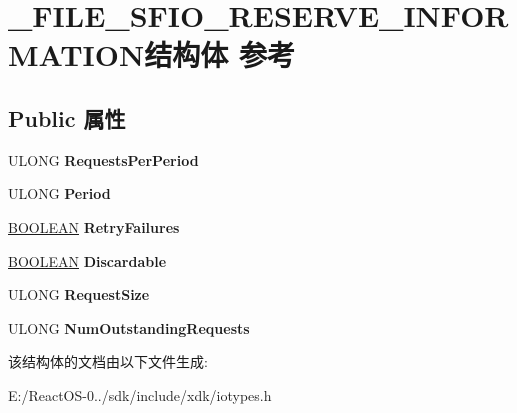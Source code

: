 \hypertarget{struct___f_i_l_e___s_f_i_o___r_e_s_e_r_v_e___i_n_f_o_r_m_a_t_i_o_n}{}\section{\+\_\+\+F\+I\+L\+E\+\_\+\+S\+F\+I\+O\+\_\+\+R\+E\+S\+E\+R\+V\+E\+\_\+\+I\+N\+F\+O\+R\+M\+A\+T\+I\+O\+N结构体 参考}
\label{struct___f_i_l_e___s_f_i_o___r_e_s_e_r_v_e___i_n_f_o_r_m_a_t_i_o_n}
\subsection*{Public 属性}
\begin{DoxyCompactItemize}
\item 
\mbox{\label{struct___f_i_l_e___s_f_i_o___r_e_s_e_r_v_e___i_n_f_o_r_m_a_t_i_o_n_ab698cd09c96685b260926b89ec61195f}} 
U\+L\+O\+NG {\bfseries Requests\+Per\+Period}
\item 
\mbox{\label{struct___f_i_l_e___s_f_i_o___r_e_s_e_r_v_e___i_n_f_o_r_m_a_t_i_o_n_a633493f5b7dbd9a9ecf31043e99de366}} 
U\+L\+O\+NG {\bfseries Period}
\item 
\mbox{\label{struct___f_i_l_e___s_f_i_o___r_e_s_e_r_v_e___i_n_f_o_r_m_a_t_i_o_n_a7668650e4a180e6384a37945d238d036}} 
\hyperlink{_processor_bind_8h_a112e3146cb38b6ee95e64d85842e380a}{B\+O\+O\+L\+E\+AN} {\bfseries Retry\+Failures}
\item 
\mbox{\label{struct___f_i_l_e___s_f_i_o___r_e_s_e_r_v_e___i_n_f_o_r_m_a_t_i_o_n_acbb9f4d9cbe1c15e2149550d92547b7a}} 
\hyperlink{_processor_bind_8h_a112e3146cb38b6ee95e64d85842e380a}{B\+O\+O\+L\+E\+AN} {\bfseries Discardable}
\item 
\mbox{\label{struct___f_i_l_e___s_f_i_o___r_e_s_e_r_v_e___i_n_f_o_r_m_a_t_i_o_n_a7e3a426710cf6d54d124801a671249fb}} 
U\+L\+O\+NG {\bfseries Request\+Size}
\item 
\mbox{\label{struct___f_i_l_e___s_f_i_o___r_e_s_e_r_v_e___i_n_f_o_r_m_a_t_i_o_n_a5ab2d5f336241154a80f6da483eadc25}} 
U\+L\+O\+NG {\bfseries Num\+Outstanding\+Requests}
\end{DoxyCompactItemize}


该结构体的文档由以下文件生成\+:\begin{DoxyCompactItemize}
\item 
E\+:/\+React\+O\+S-\/0../sdk/include/xdk/iotypes.\+h\end{DoxyCompactItemize}
